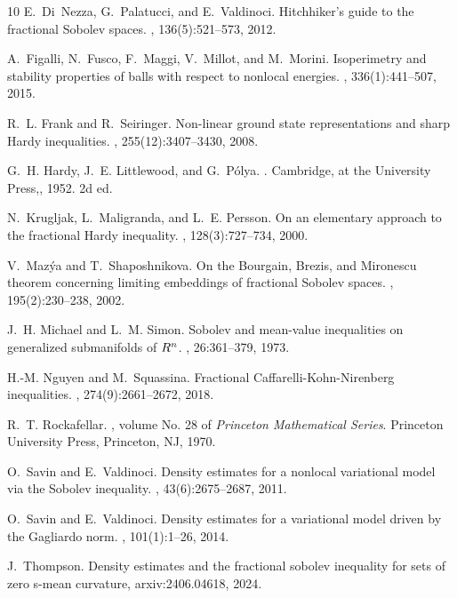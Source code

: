 \documentclass[reqno,12pt]{amsart}
\numberwithin{equation}{section}
\theoremstyle{plain}
\theoremstyle{definition}
\begin{document}
\begin{thebibliography}{10}
E.~Di~Nezza, G.~Palatucci, and E.~Valdinoci.
\newblock Hitchhiker's guide to the fractional {S}obolev spaces.
, 136(5):521--573, 2012.

A.~Figalli, N.~Fusco, F.~Maggi, V.~Millot, and M.~Morini.
\newblock Isoperimetry and stability properties of balls with respect to
  nonlocal energies.
, 336(1):441--507, 2015.

R.~L. Frank and R.~Seiringer.
\newblock Non-linear ground state representations and sharp {H}ardy
  inequalities.
, 255(12):3407--3430, 2008.

G.~H. Hardy, J.~E. Littlewood, and G.~P\'{o}lya.
.
\newblock Cambridge, at the University Press,, 1952.
\newblock 2d ed.

N.~Krugljak, L.~Maligranda, and L.~E. Persson.
\newblock On an elementary approach to the fractional {H}ardy inequality.
, 128(3):727--734, 2000.

V.~Maz\'ya and T.~Shaposhnikova.
\newblock On the {B}ourgain, {B}rezis, and {M}ironescu theorem concerning
  limiting embeddings of fractional {S}obolev spaces.
, 195(2):230--238, 2002.

J.~H. Michael and L.~M. Simon.
\newblock Sobolev and mean-value inequalities on generalized submanifolds of
  {$R\sp{n}$}.
, 26:361--379, 1973.

H.-M. Nguyen and M.~Squassina.
\newblock Fractional {C}affarelli-{K}ohn-{N}irenberg inequalities.
, 274(9):2661--2672, 2018.

R.~T. Rockafellar.
, volume No. 28 of {\em Princeton Mathematical
  Series}.
\newblock Princeton University Press, Princeton, NJ, 1970.

O.~Savin and E.~Valdinoci.
\newblock Density estimates for a nonlocal variational model via the {S}obolev
  inequality.
, 43(6):2675--2687, 2011.

O.~Savin and E.~Valdinoci.
\newblock Density estimates for a variational model driven by the {G}agliardo
  norm.
, 101(1):1--26, 2014.

J.~Thompson.
\newblock Density estimates and the fractional sobolev inequality for sets of
  zero s-mean curvature, arxiv:2406.04618, 2024.

\end{thebibliography}
\end{document}
